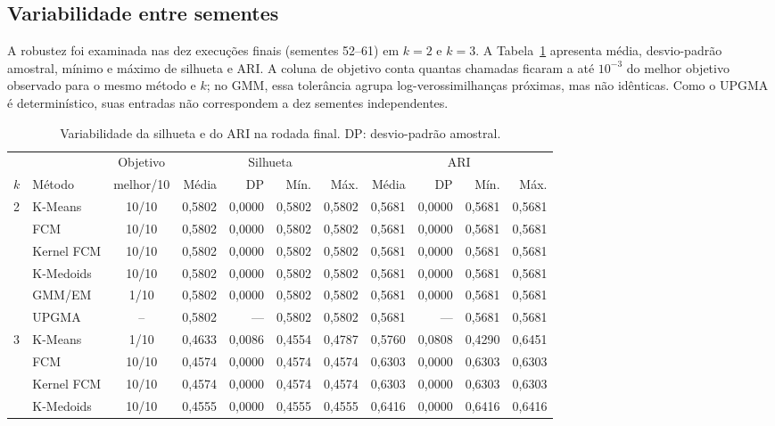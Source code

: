 \documentclass[conference,a4paper]{IEEEtran}
\begin{document}
\subsection{Variabilidade entre sementes}
A robustez foi examinada nas dez execuções finais (sementes 52--61) em $k=2$ e $k=3$. A Tabela~\ref{tab:var} apresenta média, desvio-padrão amostral, mínimo e máximo de silhueta e ARI. A coluna de objetivo conta quantas chamadas ficaram a até $10^{-3}$ do melhor objetivo observado para o mesmo método e $k$; no GMM, essa tolerância agrupa log-verossimilhanças próximas, mas não idênticas. Como o UPGMA é determinístico, suas entradas não correspondem a dez sementes independentes.

\begin{table}[!t]
\caption{Variabilidade da silhueta e do ARI na rodada final. DP: desvio-padrão amostral.}
\label{tab:var}
\centering\scriptsize
\begin{tabular}{@{}llc rrrr rrrr@{}}
\toprule
& & Objetivo & \multicolumn{4}{c}{Silhueta} & \multicolumn{4}{c}{ARI}\\
\cmidrule(lr){4-7}\cmidrule(l){8-11}
$k$ & Método & melhor/10 & Média & DP & Mín. & Máx. & Média & DP & Mín. & Máx.\\
\midrule
\multirow{6}{*}{2}
& K-Means & 10/10 & 0,5802 & 0,0000 & 0,5802 & 0,5802 & 0,5681 & 0,0000 & 0,5681 & 0,5681\\
& FCM & 10/10 & 0,5802 & 0,0000 & 0,5802 & 0,5802 & 0,5681 & 0,0000 & 0,5681 & 0,5681\\
& Kernel FCM & 10/10 & 0,5802 & 0,0000 & 0,5802 & 0,5802 & 0,5681 & 0,0000 & 0,5681 & 0,5681\\
& K-Medoids & 10/10 & 0,5802 & 0,0000 & 0,5802 & 0,5802 & 0,5681 & 0,0000 & 0,5681 & 0,5681\\
& GMM/EM & 1/10 & 0,5802 & 0,0000 & 0,5802 & 0,5802 & 0,5681 & 0,0000 & 0,5681 & 0,5681\\
& UPGMA & -- & 0,5802 & --- & 0,5802 & 0,5802 & 0,5681 & --- & 0,5681 & 0,5681\\
\midrule
\multirow{6}{*}{3}
& K-Means & 1/10 & 0,4633 & 0,0086 & 0,4554 & 0,4787 & 0,5760 & 0,0808 & 0,4290 & 0,6451\\
& FCM & 10/10 & 0,4574 & 0,0000 & 0,4574 & 0,4574 & 0,6303 & 0,0000 & 0,6303 & 0,6303\\
& Kernel FCM & 10/10 & 0,4574 & 0,0000 & 0,4574 & 0,4574 & 0,6303 & 0,0000 & 0,6303 & 0,6303\\
& K-Medoids & 10/10 & 0,4555 & 0,0000 & 0,4555 & 0,4555 & 0,6416 & 0,0000 & 0,6416 & 0,6416\\

\end{tabular}
\end{table}
\end{document}
